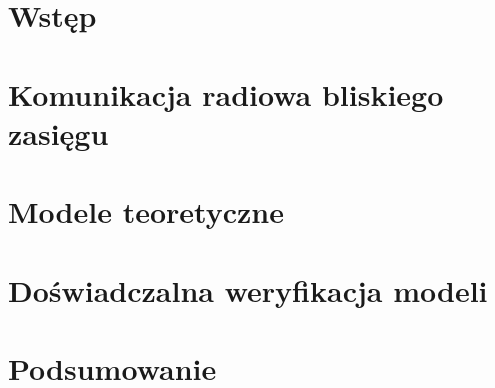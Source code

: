 \chapter{Wstęp}


\chapter{Komunikacja radiowa bliskiego zasięgu}


\chapter{Modele teoretyczne}


\chapter{Doświadczalna weryfikacja modeli}


\chapter{Podsumowanie}
\label{ch:podsumowanie}

